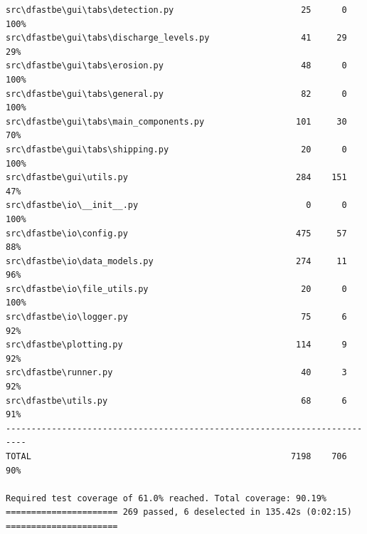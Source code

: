 \begin{Verbatim}[fontsize=\tiny]
src\dfastbe\gui\tabs\detection.py                         25      0   100%
src\dfastbe\gui\tabs\discharge_levels.py                  41     29    29%
src\dfastbe\gui\tabs\erosion.py                           48      0   100%
src\dfastbe\gui\tabs\general.py                           82      0   100%
src\dfastbe\gui\tabs\main_components.py                  101     30    70%
src\dfastbe\gui\tabs\shipping.py                          20      0   100%
src\dfastbe\gui\utils.py                                 284    151    47%
src\dfastbe\io\__init__.py                                 0      0   100%
src\dfastbe\io\config.py                                 475     57    88%
src\dfastbe\io\data_models.py                            274     11    96%
src\dfastbe\io\file_utils.py                              20      0   100%
src\dfastbe\io\logger.py                                  75      6    92%
src\dfastbe\plotting.py                                  114      9    92%
src\dfastbe\runner.py                                     40      3    92%
src\dfastbe\utils.py                                      68      6    91%
--------------------------------------------------------------------------
TOTAL                                                   7198    706    90%

Required test coverage of 61.0% reached. Total coverage: 90.19%
====================== 269 passed, 6 deselected in 135.42s (0:02:15) ======================
\end{Verbatim}
